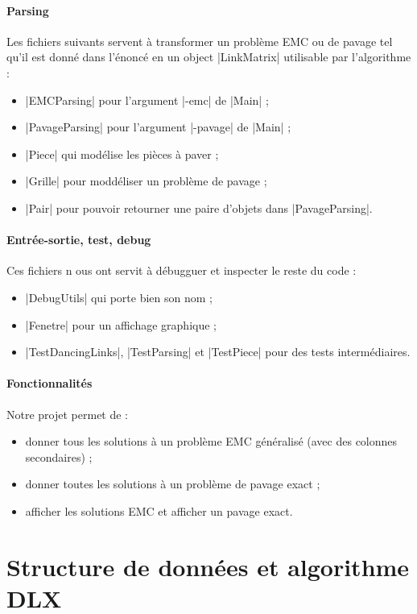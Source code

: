 \documentclass[11pt,french,a4paper]{article}
\begin{document}
\paragraph{Parsing} Les fichiers suivants servent à transformer un problème EMC ou de pavage tel qu'il est donné dans l'énoncé en un object |LinkMatrix| utilisable par l'algorithme :
\begin{itemize}
	\item |EMCParsing| pour l'argument |-emc| de |Main| ;
	\item |PavageParsing| pour l'argument |-pavage| de |Main| ;
	\item |Piece| qui modélise les pièces à paver ;
	\item |Grille| pour moddéliser un problème de pavage ;
	\item |Pair| pour pouvoir retourner une paire d'objets dans |PavageParsing|.
\end{itemize}

\paragraph{Entrée-sortie, test, debug} Ces fichiers n ous ont servit à débugguer et inspecter le reste du code :
\begin{itemize}
	\item |DebugUtils| qui porte bien son nom ;
	\item |Fenetre| pour un affichage graphique ;
	\item |TestDancingLinks|, |TestParsing| et |TestPiece| pour des tests intermédiaires.
\end{itemize}

\paragraph{Fonctionnalités} Notre projet permet de :
\begin{itemize}
	\item donner tous les solutions à un problème EMC généralisé (avec des colonnes secondaires) ;
	\item donner toutes les solutions à un problème de pavage exact ;
	\item afficher les solutions EMC et afficher un pavage exact.
\end{itemize}


\section{Structure de données et algorithme DLX}
\end{document}
